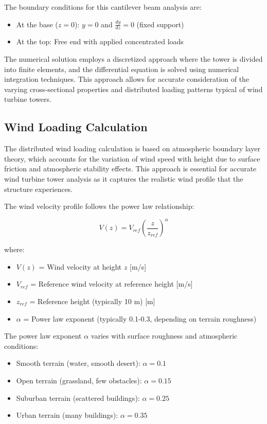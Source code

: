 \documentclass[12pt]{article}
\begin{document}
The boundary conditions for this cantilever beam analysis are:
\begin{itemize}
    \item At the base ($z = 0$): $y = 0$ and $\frac{dy}{dz} = 0$ (fixed support)
    \item At the top: Free end with applied concentrated loads
\end{itemize}

The numerical solution employs a discretized approach where the tower is divided into finite elements, and the differential equation is solved using numerical integration techniques. This approach allows for accurate consideration of the varying cross-sectional properties and distributed loading patterns typical of wind turbine towers.

\subsection{Wind Loading Calculation}

The distributed wind loading calculation is based on atmospheric boundary layer theory, which accounts for the variation of wind speed with height due to surface friction and atmospheric stability effects. This approach is essential for accurate wind turbine tower analysis as it captures the realistic wind profile that the structure experiences.

The wind velocity profile follows the power law relationship:

\begin{equation}
V(z) = V_{ref} \left(\frac{z}{z_{ref}}\right)^{\alpha}
\end{equation}

where:
\begin{itemize}
    \item $V(z)$ = Wind velocity at height $z$ [m/s]
    \item $V_{ref}$ = Reference wind velocity at reference height [m/s]
    \item $z_{ref}$ = Reference height (typically 10 m) [m]
    \item $\alpha$ = Power law exponent (typically 0.1-0.3, depending on terrain roughness)
\end{itemize}

The power law exponent $\alpha$ varies with surface roughness and atmospheric conditions:
\begin{itemize}
    \item Smooth terrain (water, smooth desert): $\alpha = 0.1$
    \item Open terrain (grassland, few obstacles): $\alpha = 0.15$
    \item Suburban terrain (scattered buildings): $\alpha = 0.25$
    \item Urban terrain (many buildings): $\alpha = 0.35$
\end{itemize}
\end{document}
